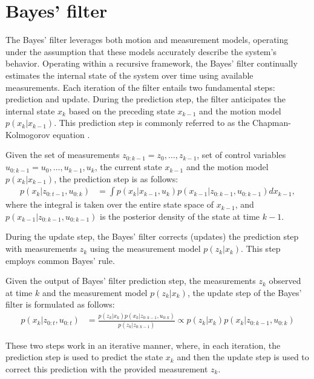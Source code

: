 \section{Bayes' filter}
The Bayes' filter leverages both motion and measurement models, operating under the assumption that these models
accurately describe the system's behavior. Operating within a recursive framework, the Bayes' filter continually
estimates the internal state of the system over time using available measurements. Each iteration of the filter
entails two fundamental steps: prediction and update. During the prediction step, the filter anticipates the internal
state $x_k$ based on the preceding state $x_{k-1}$ and the motion model $p(x_k|x_{k-1})$. This prediction step is
commonly referred to as the Chapman-Kolmogorov equation \cite{DedeciusSeq2017}.
\begin{theorem}
    Given the set of measurements $z_{0:k-1} = {z_0,\dots, z_{k-1}}$, set of control variables $u_{0:k-1} = {u_0,\dots, u_{k-1}, u_k}$, the current state $x_{k-1}$ and the motion model $p(x_k|x_{k-1})$, the prediction step is as follows:
    \begin{align}
        p(x_k|z_{0:t-1}, u_{0:k}) &= \int p(x_k|x_{k-1}, u_k) p(x_{k-1}|z_{0:k-1}, u_{0:k-1}) dx_{k-1},
        \label{eq:chapman_kolmogorov_predict}
    \end{align}
    where the integral is taken over the entire state space of $x_{k-1}$, and $p(x_{k-1}|z_{0:k-1}, u_{0:k-1})$ is
    the posterior density of the state at time $k-1$.
\end{theorem}
During the update step, the Bayes' filter corrects (updates) the prediction step with measurements $z_k$ using the
measurement model $p(z_k|x_k)$. This step employs common Bayes' rule.
\begin{theorem}
    Given the output of Bayes' filter prediction step, the measurements $z_k$ observed at time $k$ and the
    measurement model $p(z_k|x_k)$, the update step of the Bayes' filter is formulated as follows:
    \begin{align}
        \label{eq:bayes_update}
        p(x_k|z_{0:t}, u_{0:t}) &= \frac{p(z_k|x_k) p(x_k|z_{0:k-1},u_{0:k})}{p(z_k|z_{0:k-1})} \propto p(z_k|x_k) p
        (x_k|z_{0:k-1},u_{0:k})
    \end{align}
\end{theorem}
These two steps work in an iterative manner, where, in each iteration, the prediction step is used to predict
the state $x_k$ and then the update step is used to correct this prediction with the provided measurement $z_k$.
